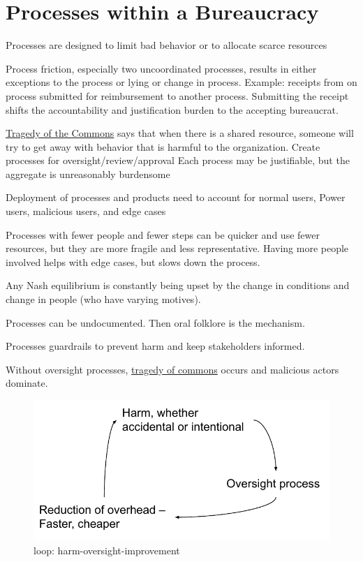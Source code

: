 \section{Processes within a Bureaucracy}

Processes are designed to limit bad behavior or to allocate scarce resources

Process friction, especially two uncoordinated processes, results in either exceptions to the process or lying or change in process. 
Example: receipts from on process submitted for reimbursement to another process.
Submitting the receipt shifts the accountability and justification burden to the accepting bureaucrat.


\href{https://en.wikipedia.org/wiki/Tragedy_of_the_commons}{Tragedy of the Commons} says that when there is a shared resource, someone will try to get away with behavior that is harmful to the organization.
Create processes for oversight/review/approval
Each process may be justifiable, but the aggregate is unreasonably burdensome


Deployment of processes and products need to account for 
normal users, Power users, malicious users, and edge cases



Processes with fewer people and fewer steps can be quicker and use fewer resources, but they are more fragile and less representative. Having more people involved helps with edge cases, but slows down the process. 

Any Nash equilibrium is constantly being upset by the change in conditions and change in people (who have varying motives).


    Processes can be undocumented. Then oral folklore is the mechanism. 
    
    Processes guardrails to prevent harm and keep stakeholders informed. 
    
    Without oversight processes, \href{https://en.wikipedia.org/wiki/Tragedy_of_the_commons}{tragedy of commons} occurs and malicious actors dominate.
    


\begin{figure}
    \centering
    \includegraphics{images/process_loop_harm-oversight-improvement}
    \caption{loop: harm-oversight-improvement}
    \label{fig:harm-oversight-improvement}
\end{figure}


